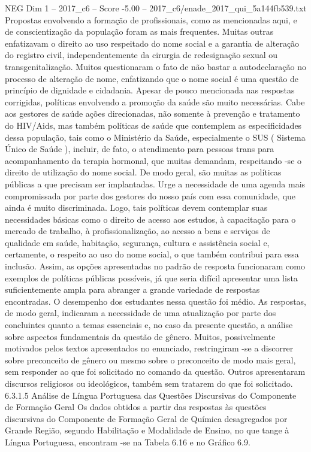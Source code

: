 \begin{textsample}{NEG Dim 1 – 2017\_c6 – Score -5.00 – 2017\_c6/enade\_2017\_qui\_5a144fb539.txt}
Propostas envolvendo a formação de profissionais, como as mencionadas aqui, e de conscientização da população foram as mais frequentes.
Muitas outras enfatizavam o direito ao uso respeitado do nome social e a garantia de alteração do registro civil, independentemente da cirurgia de redesignação sexual ou transgenitalização.
Muitos questionaram o fato de não bastar a autodeclaração no processo de alteração de nome, enfatizando que o nome social é uma questão de princípio de dignidade e cidadania.
Apesar de pouco mencionada nas respostas corrigidas, políticas envolvendo a promoção da saúde são muito necessárias.
Cabe aos gestores de saúde ações direcionadas, não somente à prevenção e tratamento do HIV/Aids, mas também políticas de saúde que contemplem as especificidades dessa população, tais como o Ministério da Saúde, especialmente o SUS ( Sistema Único de Saúde ), incluir, de fato, o atendimento para pessoas trans para acompanhamento da terapia hormonal, que muitas demandam, respeitando -se o direito de utilização do nome social.
De modo geral, são muitas as políticas públicas a que precisam ser implantadas.
Urge a necessidade de uma agenda mais compromissada por parte dos gestores do nosso país com essa comunidade, que ainda é muito discriminada.
Logo, tais políticas devem contemplar suas necessidades básicas como o direito de acesso aos estudos, à capacitação para o mercado de trabalho, à profissionalização, ao acesso a bens e serviços de qualidade em saúde, habitação, segurança, cultura e assistência social e, certamente, o respeito ao uso do nome social, o que também contribui para essa inclusão.
Assim, as opções apresentadas no padrão de resposta funcionaram como exemplos de políticas públicas possíveis, já que seria difícil apresentar uma lista suficientemente ampla para abranger a grande variedade de respostas encontradas.
O desempenho dos estudantes nessa questão foi médio.
As respostas, de modo geral, indicaram a necessidade de uma atualização por parte dos concluintes quanto a temas essenciais e, no caso da presente questão, a análise sobre aspectos fundamentais da questão de gênero.
Muitos, possivelmente motivados pelos textos apresentados no enunciado, restringiram -se a discorrer sobre preconceito de gênero ou mesmo sobre o preconceito de modo mais geral, sem responder ao que foi solicitado no comando da questão.
Outros apresentaram discursos religiosos ou ideológicos, também sem tratarem do que foi solicitado. 6.3.1.5 Análise de Língua Portuguesa das Questões Discursivas do Componente de Formação Geral Os dados obtidos a partir das respostas às questões discursivas do Componente de Formação Geral de Química desagregados por Grande Região, segundo Habilitação e Modalidade de Ensino, no que tange à Língua Portuguesa, encontram -se na Tabela 6.16 e no Gráfico 6.9.

\end{textsample}
